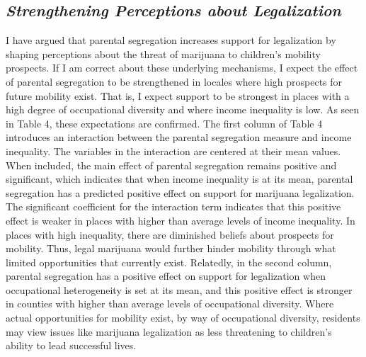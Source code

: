 
\subsection{\it{Strengthening Perceptions about Legalization}}

I have argued that parental segregation increases support for legalization by shaping perceptions about the threat of marijuana to children's mobility prospects. If I am correct about these underlying mechanisms, I expect the effect of parental segregation to be strengthened in locales where high prospects for future mobility exist. That is, I expect support to be strongest in places with a high degree of occupational diversity and where income inequality is low. As seen in Table 4, these expectations are confirmed. The first column of Table 4 introduces an interaction between the parental segregation measure and income inequality. The variables in the interaction are centered at their mean values. When included, the main effect of parental segregation remains positive and significant, which indicates that when income inequality is at its mean, parental segregation has a predicted positive effect on support for marijuana legalization. The significant coefficient for the interaction term indicates that this positive effect is weaker in places with higher than average levels of income inequality. In places with high inequality, there are diminished beliefs about prospects for mobility. Thus, legal marijuana would further hinder mobility through what limited opportunities that currently exist. Relatedly, in the second column, parental segregation has a positive effect on support for legalization when occupational heterogeneity is set at its mean, and this positive effect is stronger in counties with higher than average levels of occupational diversity. Where actual opportunities for mobility exist, by way of occupational diversity, residents may view issues like marijuana legalization as less threatening to children's ability to lead successful lives.

\begin{center}
%

\end{center}

